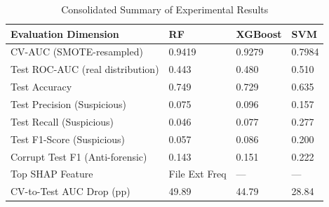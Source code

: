 \begin{table}
\centering
\caption{Consolidated Summary of Experimental Results}
\label{tab:CSES}

\begin{tabular}{| l | l | l | l |}
\hline
\textbf{Evaluation Dimension} & \textbf{RF} & \textbf{XGBoost} & \textbf{SVM} \\
\hline
CV-AUC (SMOTE-resampled) & 0.9419 & 0.9279 & 0.7984 \\
\hline
Test ROC-AUC (real distribution) & 0.443 & 0.480 & 0.510 \\
\hline
Test Accuracy & 0.749 & 0.729 & 0.635 \\
\hline
Test Precision (Suspicious) & 0.075 & 0.096 & 0.157 \\
\hline
Test Recall (Suspicious) & 0.046 & 0.077 & 0.277 \\
\hline
Test F1-Score (Suspicious) & 0.057 & 0.086 & 0.200 \\
\hline
Corrupt Test F1 (Anti-forensic) & 0.143 & 0.151 & 0.222 \\
\hline
Top SHAP Feature & File Ext Freq & — & — \\
\hline
CV-to-Test AUC Drop (pp) & 49.89 & 44.79 & 28.84 \\
\hline

\end{tabular}

\end{table}
